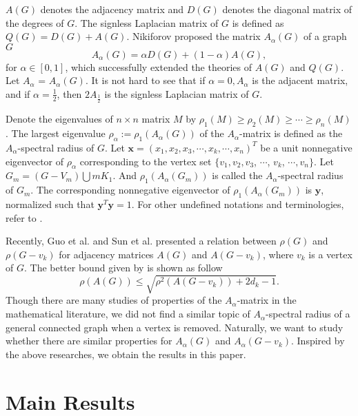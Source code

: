 \documentclass[amsthm]{elsart}
\begin{document}
\qquad  $A(G)$ denotes the adjacency matrix and $D(G)$ denotes the diagonal matrix of the degrees of $G$. The signless Laplacian matrix of $G$ is defined as $Q(G) = D(G)+ A(G).$ Nikiforov \cite{2016Merging} proposed the matrix  $A_{\alpha}(G)$  of a graph $G$ $$A_{\alpha}(G) = \alpha D(G) +(1-\alpha)A(G),$$ for $\alpha \in [0,1]$, which successfully extended the theories of $A(G)$ and $Q(G)$.  Let $A_\alpha$ = $A_\alpha(G)$. It is not hard to see that if $\alpha =0, A_{\alpha}$ is the adjacent matrix, and if $\alpha = \frac{1}{2}$, then $2A_{\frac{1}{2}}$ is the signless Laplacian matrix of $G$.

\par \qquad  Denote  the eigenvalues of $n \times n$ matrix $M$ by $\rho_1(M) \geqslant \rho_2(M) \geqslant \cdots \geqslant \rho_n(M)$. The largest eigenvalue $\rho_\alpha := \rho_1(A_{\alpha}(G))$ of the $A_\alpha$-matrix is defined as the $A_{\alpha}$-spectral radius of $G$.
 Let  $\textbf{x} = (x_1, x_2,x_3, \cdots,x_k, \cdots, x_n)^T$ be a unit nonnegative eigenvector of $\rho_\alpha$ corresponding to  the  vertex set $\{v_1, v_2,v_3$, $\cdots$, $v_k$, $\cdots, v_n\}$.
 Let $G_m =(G - V_m)  \bigcup m K_1$. And $\rho_1(A_\alpha(G_m))$ is called the $A_\alpha$-spectral radius of $G_m$.
The corresponding nonnegative eigenvector of $\rho_1(A_\alpha(G_m))$ is
$\textbf{y}$, normalized such that $\textbf{y}^{T} \textbf{y} = 1$.
For other undefined notations and terminologies, refer to \cite{2001Introduction}.



\qquad Recently, Guo et al. \cite{2019Sharp} and Sun et al. \cite{2019A} presented a relation between $\rho(G)$ and $\rho(G- v_k)$ for adjacency matrices $A(G)$ and $A(G- v_k)$, where $v_k$ is a vertex of $G$. The better bound given by \cite{2019A} is shown as follow $$ \rho(A(G)) \leqslant \sqrt{\rho^2(A(G - v_k)) + 2 d_k - 1}. $$
Though there are many studies of properties of
the $A_\alpha$-matrix in the mathematical literature, we did not find a similar topic of $A_\alpha$-spectral radius of a general connected graph when a vertex is removed.  Naturally, we want to study whether there are similar properties for $A_\alpha(G)$ and $A_\alpha(G-v_k)$. Inspired by the above researches, we obtain the results in this paper.



\section{Main Results}
\end{document}
